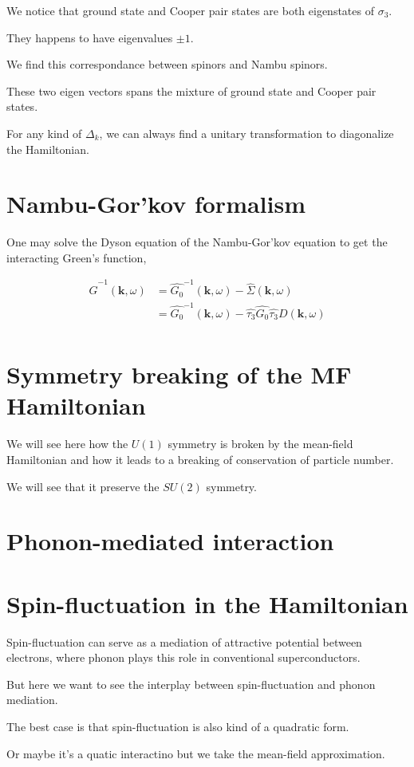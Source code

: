 \documentclass[14pt, a4paper]{extarticle}
\begin{document}
We notice that ground state and Cooper pair states are both eigenstates of $\sigma_3$.

They happens to have eigenvalues $\pm 1$.

We find this correspondance between spinors and Nambu spinors.

These two eigen vectors spans the mixture of ground state and Cooper pair states.

For any kind of $\Delta_{k}$, we can always find a unitary transformation to diagonalize the Hamiltonian.

\section{Nambu-Gor'kov formalism}

One may solve the Dyson equation of the Nambu-Gor'kov equation to get the interacting Green's function,

\begin{align}
    \hat{G}^{-1}(\mathbf{k}, \omega) & = \hat{G_0}^{-1}(\mathbf{k}, \omega) - \hat{\Sigma}(\mathbf{k}, \omega) \\
     & = \hat{G_0}^{-1}(\mathbf{k}, \omega) - \hat{\tau_3} \hat{G_0}  \hat{\tau_3} D(\mathbf{k}, \omega) \\
\end{align}





\section{Symmetry breaking of the MF Hamiltonian}

We will see here how the $U(1)$ symmetry is broken by the mean-field Hamiltonian and how it leads to a breaking of conservation of particle number.

We will see that it preserve the $SU(2)$ symmetry.

\section{Phonon-mediated interaction}






\section{Spin-fluctuation in the Hamiltonian}

Spin-fluctuation can serve as a mediation of attractive potential between electrons, where phonon plays this role in conventional superconductors.

But here we want to see the interplay between spin-fluctuation and phonon mediation.

The best case is that spin-fluctuation is also kind of a quadratic form.

Or maybe it's a quatic interactino but we take the mean-field approximation.
\end{document}
